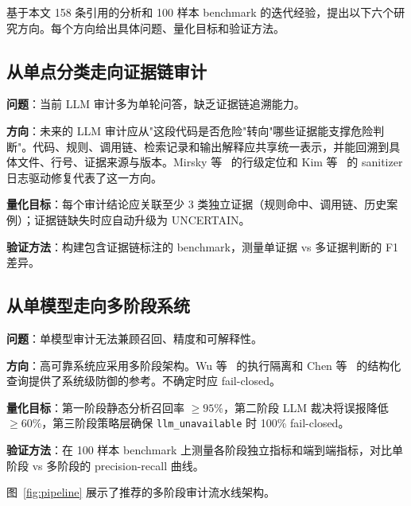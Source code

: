 \documentclass[11pt,a4paper,onecolumn]{article}
\newcommand{\risk}[1]{\texttt{#1}}
\begin{document}
基于本文 158 条引用的分析和 100 样本 benchmark 的迭代经验，提出以下六个研究方向。每个方向给出具体问题、量化目标和验证方法。

\subsection{从单点分类走向证据链审计}
\textbf{问题}：当前 LLM 审计多为单轮问答，缺乏证据链追溯能力。

\textbf{方向}：未来的 LLM 审计应从"这段代码是否危险"转向"哪些证据能支撑危险判断"。代码、规则、调用链、检索记录和输出解释应共享统一表示，并能回溯到具体文件、行号、证据来源与版本。Mirsky 等~\cite{mirsky2023vulchecker} 的行级定位和 Kim 等~\cite{kim2025san2patch} 的 sanitizer 日志驱动修复代表了这一方向。

\textbf{量化目标}：每个审计结论应关联至少 3 类独立证据（规则命中、调用链、历史案例）；证据链缺失时应自动升级为 UNCERTAIN。

\textbf{验证方法}：构建包含证据链标注的 benchmark，测量单证据 vs 多证据判断的 F1 差异。

\subsection{从单模型走向多阶段系统}
\textbf{问题}：单模型审计无法兼顾召回、精度和可解释性。

\textbf{方向}：高可靠系统应采用多阶段架构。Wu 等~\cite{wu2025isolateGpt} 的执行隔离和 Chen 等~\cite{chen2025struq} 的结构化查询提供了系统级防御的参考。不确定时应 fail-closed。

\textbf{量化目标}：第一阶段静态分析召回率 $\geq 95\%$，第二阶段 LLM 裁决将误报降低 $\geq 60\%$，第三阶段策略层确保 \risk{llm\_unavailable} 时 100\% fail-closed。

\textbf{验证方法}：在 100 样本 benchmark 上测量各阶段独立指标和端到端指标，对比单阶段 vs 多阶段的 precision-recall 曲线。

图~\ref{fig:pipeline} 展示了推荐的多阶段审计流水线架构。
\end{document}

